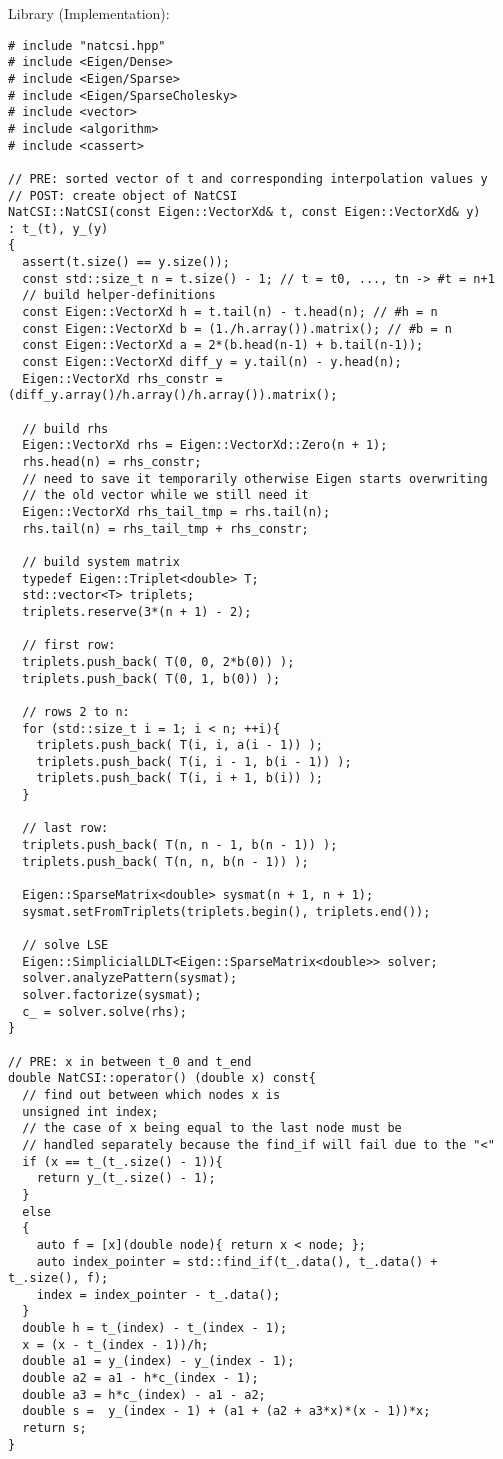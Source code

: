 \documentclass[a4paper]{article}
\begin{document}
Library (Implementation):
\begin{verbatim}
# include "natcsi.hpp"
# include <Eigen/Dense>
# include <Eigen/Sparse> 
# include <Eigen/SparseCholesky>
# include <vector>
# include <algorithm>
# include <cassert>

// PRE: sorted vector of t and corresponding interpolation values y
// POST: create object of NatCSI
NatCSI::NatCSI(const Eigen::VectorXd& t, const Eigen::VectorXd& y)
: t_(t), y_(y) 
{
  assert(t.size() == y.size());
  const std::size_t n = t.size() - 1; // t = t0, ..., tn -> #t = n+1
  // build helper-definitions
  const Eigen::VectorXd h = t.tail(n) - t.head(n); // #h = n 
  const Eigen::VectorXd b = (1./h.array()).matrix(); // #b = n
  const Eigen::VectorXd a = 2*(b.head(n-1) + b.tail(n-1));
  const Eigen::VectorXd diff_y = y.tail(n) - y.head(n);
  Eigen::VectorXd rhs_constr = (diff_y.array()/h.array()/h.array()).matrix();
  
  // build rhs
  Eigen::VectorXd rhs = Eigen::VectorXd::Zero(n + 1);
  rhs.head(n) = rhs_constr;
  // need to save it temporarily otherwise Eigen starts overwriting 
  // the old vector while we still need it
  Eigen::VectorXd rhs_tail_tmp = rhs.tail(n); 
  rhs.tail(n) = rhs_tail_tmp + rhs_constr;

  // build system matrix
  typedef Eigen::Triplet<double> T;
  std::vector<T> triplets;
  triplets.reserve(3*(n + 1) - 2);

  // first row:
  triplets.push_back( T(0, 0, 2*b(0)) );
  triplets.push_back( T(0, 1, b(0)) );

  // rows 2 to n:
  for (std::size_t i = 1; i < n; ++i){
    triplets.push_back( T(i, i, a(i - 1)) );
    triplets.push_back( T(i, i - 1, b(i - 1)) );
    triplets.push_back( T(i, i + 1, b(i)) );
  }

  // last row:
  triplets.push_back( T(n, n - 1, b(n - 1)) );
  triplets.push_back( T(n, n, b(n - 1)) );

  Eigen::SparseMatrix<double> sysmat(n + 1, n + 1);
  sysmat.setFromTriplets(triplets.begin(), triplets.end());

  // solve LSE
  Eigen::SimplicialLDLT<Eigen::SparseMatrix<double>> solver;
  solver.analyzePattern(sysmat);
  solver.factorize(sysmat);
  c_ = solver.solve(rhs);
}

// PRE: x in between t_0 and t_end
double NatCSI::operator() (double x) const{
  // find out between which nodes x is
  unsigned int index;
  // the case of x being equal to the last node must be 
  // handled separately because the find_if will fail due to the "<"
  if (x == t_(t_.size() - 1)){
    return y_(t_.size() - 1);
  }
  else
  {
    auto f = [x](double node){ return x < node; };
    auto index_pointer = std::find_if(t_.data(), t_.data() + t_.size(), f);
    index = index_pointer - t_.data();
  }
  double h = t_(index) - t_(index - 1);
  x = (x - t_(index - 1))/h;
  double a1 = y_(index) - y_(index - 1);
  double a2 = a1 - h*c_(index - 1);
  double a3 = h*c_(index) - a1 - a2;
  double s =  y_(index - 1) + (a1 + (a2 + a3*x)*(x - 1))*x;
  return s;
}
\end{verbatim}
\end{document}
